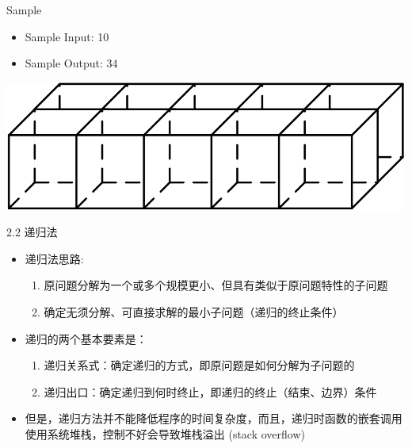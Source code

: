 \documentclass{beamer}
\begin{document}
\begin{frame}
    \begin{exampleblock}{Sample}
        \begin{itemize}
            \item Sample Input: 10
            \item Sample Output: 34
        \end{itemize}
    \end{exampleblock}
    \vfill
    \includegraphics[scale=0.7]{fig/2-1.png}
\end{frame}
\begin{frame}{2.2 递归法}
    \begin{itemize}
        \item 递归法思路:
        \begin{enumerate}
            \item 原问题分解为一个或多个规模更小、但具有类似于原问题特性的子问题
            \item 确定无须分解、可直接求解的最小子问题（递归的终止条件）
        \end{enumerate}
        \item 递归的两个基本要素是：
        \begin{enumerate}
            \item 递归关系式：确定递归的方式，即原问题是如何分解为子问题的
            \item 递归出口：确定递归到何时终止，即递归的终止（结束、边界）条件
        \end{enumerate}
        \item 但是，递归方法并不能降低程序的时间复杂度，而且，递归时函数的嵌套调用使用系统堆栈，控制不好会导致\alert{堆栈溢出} (stack overflow)
    \end{itemize}
\end{frame}
\end{document}
